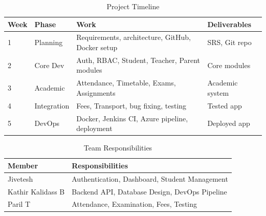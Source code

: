 \appendix

\begin{table}[h]
\centering
\begin{tabular}{|p{1.5cm}|p{3cm}|p{5cm}|p{3cm}|}
\hline
\textbf{Week} & \textbf{Phase} & \textbf{Work} & \textbf{Deliverables} \\ \hline
1 & Planning & Requirements, architecture, GitHub, Docker setup & SRS, Git repo \\ \hline
2 & Core Dev & Auth, RBAC, Student, Teacher, Parent modules & Core modules \\ \hline
3 & Academic & Attendance, Timetable, Exams, Assignments & Academic system \\ \hline
4 & Integration & Fees, Transport, bug fixing, testing & Tested app \\ \hline
5 & DevOps & Docker, Jenkins CI, Azure pipeline, deployment & Deployed app \\ \hline
\end{tabular}
\caption{Project Timeline}
\label{tab:timeline}
\end{table}

\begin{table}[h]
\centering
\begin{tabular}{|p{3cm}|p{9cm}|}
\hline
\textbf{Member} & \textbf{Responsibilities} \\ \hline
Jivetesh & Authentication, Dashboard, Student Management \\ \hline
Kathir Kalidass B & Backend API, Database Design, DevOps Pipeline \\ \hline
Paril T & Attendance, Examination, Fees, Testing \\ \hline
\end{tabular}
\caption{Team Responsibilities}
\label{tab:team}
\end{table}
